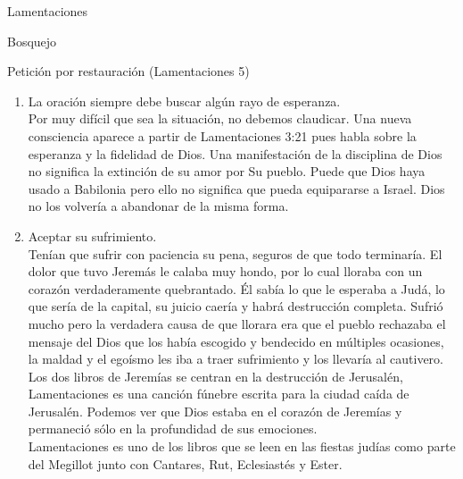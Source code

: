 \begin{section}{Lamentaciones}
\begin{subsection}{Bosquejo}
\begin{subsubsection}{Petición por restauración (Lamentaciones 5)}
\begin{enumerate}
				\item La oración siempre debe buscar algún rayo de esperanza.\\
					Por muy difícil que sea la situación, no debemos claudicar. Una nueva consciencia aparece a partir de Lamentaciones 3:21 pues habla sobre la esperanza y la fidelidad de Dios. Una manifestación de la disciplina de Dios no significa la extinción de su amor por Su pueblo. Puede que Dios haya usado a Babilonia pero ello no significa que pueda equipararse a Israel. Dios no los volvería a abandonar de la misma forma.
				\item Aceptar su sufrimiento.\\
					Tenían que sufrir con paciencia su pena, seguros de que todo terminaría. El dolor que tuvo Jeremás le calaba muy hondo, por lo cual lloraba con un corazón verdaderamente quebrantado. Él sabía lo que le esperaba a Judá, lo que sería de la capital, su juicio caería y habrá destrucción completa. Sufrió mucho pero la verdadera causa de que llorara era que el pueblo rechazaba el mensaje del Dios que los había escogido y bendecido en múltiples ocasiones, la maldad y el egoísmo les iba a traer sufrimiento y los llevaría al cautivero.\\
					Los dos libros de Jeremías se centran en la destrucción de Jerusalén, Lamentaciones es una canción fúnebre escrita para la ciudad caída de Jerusalén. Podemos ver que Dios estaba en el corazón de Jeremías y permaneció sólo en la profundidad de sus emociones.\\
					Lamentaciones es uno de los libros que se leen en las fiestas judías como parte del Megillot junto con Cantares, Rut, Eclesiastés y Ester.
			\end{enumerate}
		\end{subsubsection}
	\end{subsection}
\end{section}
%


